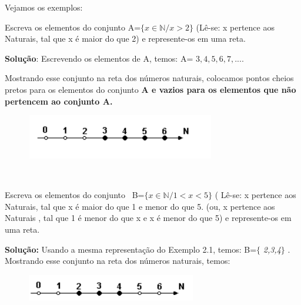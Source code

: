 Vejamos os exemplos:

\begin{texemplo}
	
	Escreva os elementos do conjunto  A=$ \{ x \in \mathbb{N}  / x > 2 \} $  (Lê-se: x pertence aos Naturais, tal que x é maior do que 2) e represente-os em uma reta.

\textbf{Solução}: Escrevendo os elementos de A, temos: A= ${ 3,4,5,6,7,... }$.

Mostrando esse conjunto na reta dos números naturais, colocamos pontos cheios pretos para os elementos do conjunto \textbf{A e vazios para os elementos que não pertencem ao conjunto A.}

\begin{figure}[H]
	\begin{Center}
		\includegraphics[width=3.26in,height=0.77in]{capitulos/conjuntos_numericos/media/image3.pdf}
	\end{Center}
\end{figure}

~~
\end{texemplo}

\begin{texemplo} 
	Escreva os elementos do conjunto~ B=$ \{ x \in \mathbb{N}  / 1< x <5 \} $  ( Lê-se: x pertence aos Naturais, tal que x é maior do que 1 e menor do que 5. (ou, x pertence aos Naturais , tal que 1 é menor do que x e x é menor do que 5) e represente-os em uma reta.

\textbf{Solução:} Usando a mesma representação do Exemplo 2.1, temos: B=$ \{ $ \textit{2,3,4}$ \} $ . Mostrando esse conjunto na reta dos números naturais, temos:

\begin{figure}[H]
	\begin{Center}
		\includegraphics[width=2.93in,height=0.45in]{capitulos/conjuntos_numericos/media/image4.pdf}
	\end{Center}
\end{figure}
\end{texemplo}

